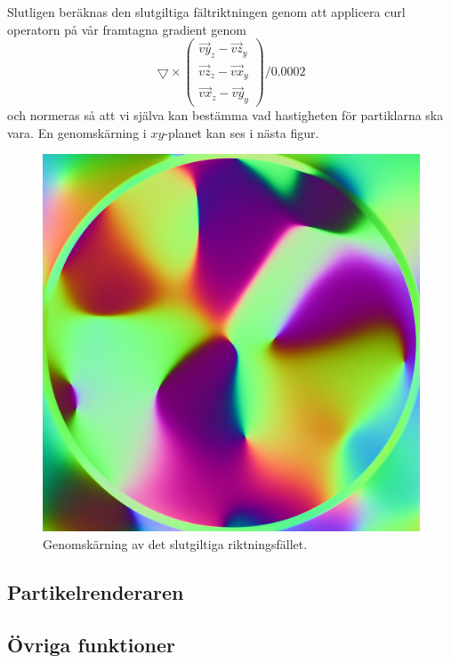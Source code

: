 \documentclass[a4paper]{article}
\begin{document}
\begin{multicols}{2}
Slutligen beräknas den slutgiltiga fältriktningen genom att applicera curl operatorn på vår framtagna gradient genom
\begin{equation}
\bigtriangledown \times \begin{pmatrix}
\vec{vy}_z - \vec{vz}_y
\\ 
\vec{vz}_z - \vec{vx}_y
\\ 
\vec{vx}_z - \vec{vy}_y
\end{pmatrix} / 0.0002
\end{equation}
och normeras så att vi själva kan bestämma vad hastigheten för partiklarna ska vara. En genomskärning i $xy$-planet kan ses i nästa figur.
\begin{figure}[H]
\center
\begin{minipage}[]{0.3\textwidth}
\includegraphics[width=\textwidth]{share/Curl.png}
\caption{Genomskärning av det slutgiltiga riktningsfället.}
\end{minipage}
\end{figure}

\subsection{Partikelrenderaren}

\subsection{Övriga funktioner}


\end{multicols}
\end{document}
